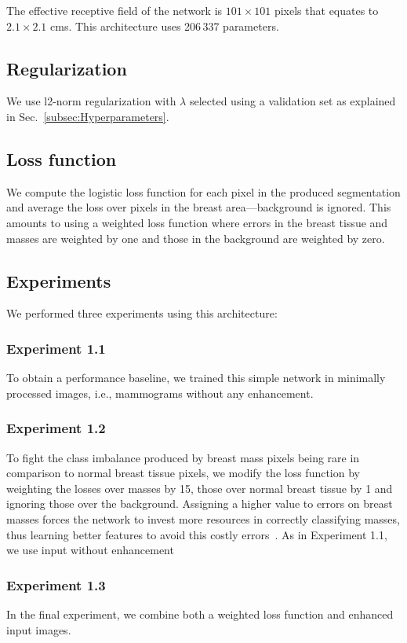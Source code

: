 The effective receptive field of the network is $101 \times 101$ pixels that equates to $2.1 \times 2.1$ cms. This architecture uses 206\,337 parameters. %

\subsection{Regularization}
We use l2-norm regularization with $\lambda$ selected using a validation set as explained in Sec.~\ref{subsec:Hyperparameters}.

\subsection{Loss function}
We compute the logistic loss function for each pixel in the produced segmentation and average the loss over pixels in the breast area---background is ignored. This amounts to using a weighted loss function where errors in the breast tissue and masses are weighted by one and those in the background are weighted by zero.

\subsection{Experiments}
We performed three experiments using this architecture:
\subsubsection{Experiment 1.1} 
To obtain a performance baseline, we trained this simple network in minimally processed images, i.e., mammograms without any enhancement.

\subsubsection{Experiment 1.2} 
\label{subsec:Experiment1_2}
To fight the class imbalance produced by breast mass pixels being rare in comparison to normal breast tissue pixels, we modify the loss function by weighting the losses over masses by 15, those over normal breast tissue by 1 and ignoring those over the background. Assigning a higher value to errors on breast masses forces the network to invest more resources in correctly classifying masses, thus learning better features to avoid this costly errors~\cite{Provost2000}. As in Experiment 1.1, we use input without enhancement

\subsubsection{Experiment 1.3}
In the final experiment, we combine both a weighted loss function and enhanced input images.
